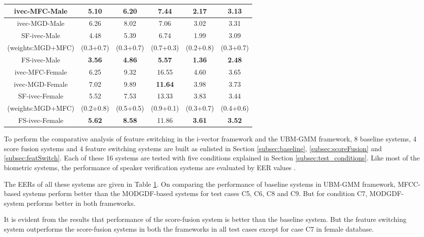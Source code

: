 \documentclass{article}
\begin{document}
\begin{table}[h]
\begin{tabular}{|c|c|c|c|c|c|}
{ivec-MFC-Male} & 5.10 & 6.20 & 7.44 & 2.17 & 3.13 \\ \hline

{ivec-MGD-Male} &  6.26 & 8.02 & 7.06 & 3.02 & 3.31  \\ \hline

SF-ivec-Male & 4.48 & 5.39 & 6.74 & 1.99 & 3.09 \\ 
(weights:MGD+MFC) & (0.3+0.7) & (0.3+0.7) & (0.7+0.3) & (0.2+0.8) & (0.3+0.7) \\ \hline

{FS-ivec-Male} & {\bf 3.56} & {\bf 4.86} & {\bf 5.57} & {\bf 1.36} & {\bf 2.48} \\ \hline

{ivec-MFC-Female} & 6.25 & 9.32 & 16.55 & 4.60 & 3.65 \\ \hline

{ivec-MGD-Female} & 7.02 & 9.89 & {\bf 11.64} & 3.98 & 3.73 \\ \hline 

SF-ivec-Female & 5.52 & 7.53 & 13.33 & 3.83 & 3.44 \\ 
(weights:MGD+MFC) & (0.2+0.8) & (0.5+0.5) & (0.9+0.1) & (0.3+0.7) & (0.4+0.6) \\ \hline

{FS-ivec-Female} & {\bf 5.62} & {\bf 8.58} & 11.86 & {\bf 3.61} & {\bf 3.52} \\ \hline

	\end{tabular}
	\label{tab:eer}
	\end{table}

To perform the comparative analysis of feature switching in the i-vector framework and the UBM-GMM framework, 8 baseline systems, 4 score fusion systems and 4 feature switching systems are built as enlisted in Section \ref{subsec:baseline}, \ref{subsec:scoreFusion} and \ref{subsec:featSwitch}. Each of these 16 systems are tested with five conditions explained in Section \ref{subsec:test_conditions}. Like most of the biometric systems, the performance of  speaker verification systems are evaluated by EER values \cite{eer1}. 

\vspace{0.25cm}
The EERs of all these systems are given in Table \ref{tab:eer}. On comparing the performance of baseline systems in UBM-GMM framework, MFCC-based systems perform better than the MODGDF-based systems for test cases C5, C6, C8 and C9. But for condition C7, MODGDF-system performs better in both frameworks. 

\vspace{0.25cm}
It is evident from the results that performance of the score-fusion system is better than the baseline system. But the feature switching system outperforms the score-fusion systems in both the frameworks in all test cases except for case C7 in female database.
\end{document}
